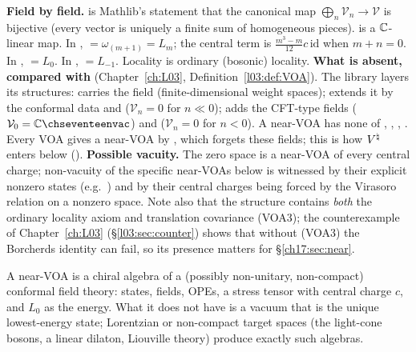 \begin{dictionary}
\textbf{Field by field.}  is Mathlib's statement that the canonical map
$\bigoplus_n\mathcal V_n\to\mathcal V$ is bijective (every vector is uniquely a finite sum of homogeneous
pieces).   is a ${\mathbb{C}}$-linear map.  In , 
$=\omega_{(m+1)}=L_m$; the central term is $\frac{m^3-m}{12}c\,\mathrm{id}$ when $m+n=0$.  In
,  $=L_0$.  In ,
 $=L_{-1}$.  Locality is ordinary (bosonic) locality.
\textbf{What is absent, compared with } (Chapter~\ref{ch:L03},
Definition~\ref{l03:def:VOA}).  The library layers its structures:  carries the field
 (finite-dimensional weight spaces);  extends it by the
conformal data and  ($\mathcal V_n=0$ for $n\ll0$); 
adds the CFT-type fields  ($\mathcal V_0=\C\chseventeenvac$) and 
($\mathcal V_n=0$ for $n<0$).  A near-VOA has none of , ,
, .
Every VOA gives a near-VOA by , which forgets these fields; this is
how ${V^{\natural}}$ enters below ().
\textbf{Possible vacuity.} The zero space is a near-VOA of every central charge; non-vacuity of the specific
near-VOAs below is witnessed by their explicit nonzero states (e.g.\ ) and
by their central charges being forced by the Virasoro relation on a nonzero space.  Note also that the
structure contains \emph{both} the ordinary locality axiom and translation covariance (VOA3); the counterexample
of Chapter~\ref{ch:L03} (\S\ref{l03:sec:counter}) shows that without (VOA3) the Borcherds identity can fail, so
its presence matters for \S\ref{ch17:sec:near}.
\end{dictionary}

\begin{physics}
A near-VOA is a chiral algebra of a (possibly non-unitary, non-compact) conformal field theory: states,
fields, OPEs, a stress tensor with central charge $c$, and $L_0$ as the energy.  What it does not have is a
vacuum that is the unique lowest-energy state; Lorentzian or non-compact target spaces (the light-cone
bosons, a linear dilaton, Liouville theory) produce exactly such algebras.
\end{physics}

